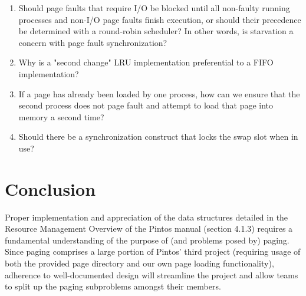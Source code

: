 \documentclass[11pt, letterpaper]{article}
\begin{document}
\begin{enumerate}
\item Should page faults that require I/O be blocked until all non-faulty running processes and non-I/O page faults finish execution, or should their precedence be determined with a round-robin scheduler? In other words, is starvation a concern with page fault synchronization?
\item Why is a "second change" LRU implementation preferential to a FIFO implementation?
\item If a page has already been loaded by one process, how can we ensure that the second process does not page fault and attempt to load that page into memory a second time?
\item Should there be a synchronization construct that locks the swap slot when in use?
\end{enumerate}

\section*{Conclusion}
	Proper implementation and appreciation of the data structures detailed in the Resource Management Overview of the Pintos manual (section 4.1.3) requires a fundamental understanding of the purpose of (and problems posed by) paging. Since paging comprises a large portion of Pintos' third project (requiring usage of both the provided page directory and our own page loading functionality), adherence to well-documented design will streamline the project and allow teams to split up the paging subproblems amongst their members.
\pagebreak
\begin{appendices}

%

\pagebreak

%

\end{appendices}
\end{document}
